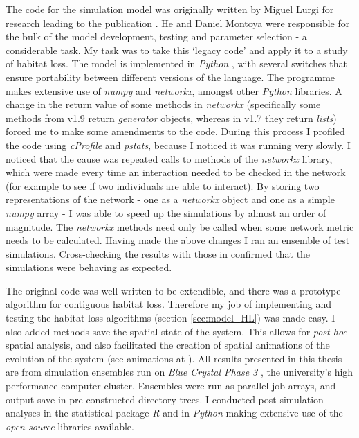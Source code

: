 The code for the simulation model was originally written by Miguel Lurgi for research leading to the publication \cite{lurgi2015effects}. He and Daniel Montoya were responsible for the bulk of the model development, testing and parameter selection - a considerable task. My task was to take this `legacy code' and apply it to a study of habitat loss. The model is implemented in \emph{Python} \cite{python}, with several switches that ensure portability between different versions of the language. The programme makes extensive use of \emph{numpy} and \emph{networkx}, amongst other \emph{Python} libraries. A change in the return value of some methods in \emph{networkx} (specifically some methods from v1.9 return \emph{generator} objects, whereas in v1.7 they return \emph{lists}) forced me to make some amendments to the code. During this process I profiled the code using \emph{cProfile} and \emph{pstats}, because I noticed it was running very slowly. I noticed that the cause was repeated calls to methods of the \emph{networkx} library, which were made every time an interaction needed to be checked in the network (for example to see if two individuals are able to interact). By storing two representations of the network - one as a \emph{networkx} object and one as a simple \emph{numpy} array - I was able to speed up the simulations by almost an order of magnitude. The \emph{networkx} methods need only be called when some network metric needs to be calculated. Having made the above changes I ran an ensemble of test simulations. Cross-checking the results with those in \cite{lurgi2015effects} confirmed that the simulations were behaving as expected.    

The original code was well written to be extendible, and there was a prototype algorithm for contiguous habitat loss. Therefore my job of implementing and testing the habitat loss algorithms (section \ref{sec:model_HL}) was made easy. I also added methods save the spatial state of the system. This allows for \emph{post-hoc} spatial analysis, and also facilitated the creation of spatial animations of the evolution of the system (see animations at \cite{mcwilliams2015anim}). All results presented in this thesis are from simulation ensembles run on \emph{Blue Crystal Phase 3} \cite{BC3}, the university's high performance computer cluster. Ensembles were run as parallel job arrays, and output save in pre-constructed directory trees. I conducted post-simulation analyses in the statistical package \emph{R} \cite{Rlanguage}and in \emph{Python} making extensive use of the \emph{open source} libraries available.


